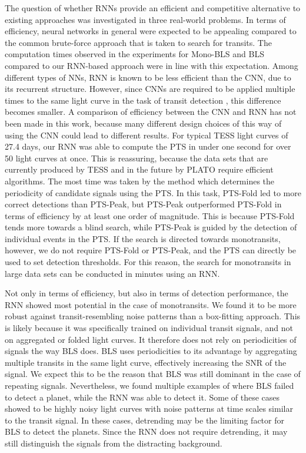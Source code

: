 The question of whether RNNs provide an efficient and competitive alternative to existing approaches was investigated in three real-world problems. In terms of efficiency, neural networks in general were expected to be appealing compared to the common brute-force approach that is taken to search for transits. The computation times observed in the experiments for Mono-BLS and BLS compared to our RNN-based approach were in line with this expectation. Among different types of NNs, RNN is known to be less efficient than the CNN, due to its recurrent structure. However, since CNNs are required to be applied multiple times to the same light curve in the task of transit detection \cite{pearson2018searching}, this difference becomes smaller. A comparison of efficiency between the CNN and RNN has not been made in this work,  because many different design choices of this way of using the CNN could lead to different results. For typical TESS light curves of 27.4 days, our RNN was able to compute the PTS in under one second for over 50 light curves at once. This is reassuring, because the data sets that are currently produced by TESS and in the future by PLATO require efficient algorithms. The most time was taken by the method which determines the periodicity of candidate signals using the PTS. In this task, PTS-Fold led to more correct detections than PTS-Peak, but PTS-Peak outperformed PTS-Fold in terms of efficiency by at least one order of magnitude. This is because PTS-Fold tends more towards a blind search, while PTS-Peak is guided by the detection of individual events in the PTS. If the search is directed towards monotransits, however, we do not require PTS-Fold or PTS-Peak, and the PTS can directly be used to set detection thresholds. For this reason, the search for monotransits in large data sets can be conducted in minutes using an RNN.

Not only in terms of efficiency, but also in terms of detection performance, the RNN showed most potential in the case of monotransits. We found it to be more robust against transit-resembling noise patterns than a box-fitting approach. This is likely because it was specifically trained on individual transit signals, and not on aggregated or folded light curves. It therefore does not rely on periodicities of signals the way BLS does. BLS uses periodicities to its advantage by aggregating multiple transits in the same light curve, effectively increasing the SNR of the signal. We expect this to be the reason that BLS was still dominant in the case of repeating signals. Nevertheless, we found multiple examples of where BLS failed to detect a planet, while the RNN was able to detect it. Some of these cases showed to be highly noisy light curves with noise patterns at time scales similar to the transit signal. In these cases, detrending may be the limiting factor for BLS to detect the planets. Since the RNN does not require detrending, it may still distinguish the signals from the distracting background.

